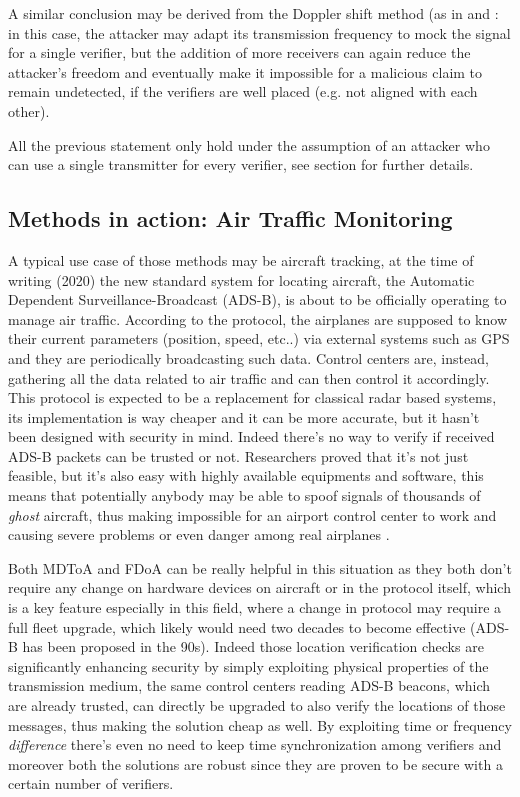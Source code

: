 \documentclass[conference]{IEEEtran}
\begin{document}
A similar conclusion may be derived from the Doppler shift method (as in \cite{schaefer16} and \cite{ghose15}: in this case, the attacker may adapt its transmission frequency to mock the signal for a single verifier, but the addition of more receivers can again reduce the attacker's freedom and eventually make it impossible for a malicious claim to remain undetected, if the verifiers are well placed (e.g. not aligned with each other).

All the previous statement only hold under the assumption of an attacker who can use a single transmitter for every verifier, see section %
for further details.

\subsection{Methods in action: Air Traffic Monitoring}

A typical use case of those methods may be aircraft tracking, at the time of writing (2020) the new standard system for locating aircraft, the Automatic Dependent Surveillance-Broadcast (ADS-B), is about to be officially operating to manage air traffic. According to the protocol, the airplanes are supposed to know their current parameters (position, speed, etc..) via external systems such as GPS and they are periodically broadcasting such data. Control centers are, instead, gathering all the data related to air traffic and can then control it accordingly. This protocol is expected to be a replacement for classical radar based systems, its implementation is way cheaper and it can be more accurate, but it hasn't been designed with security in mind. Indeed there's no way to verify if received ADS-B packets can be trusted or not.
Researchers proved that it's not just feasible, but it's also easy with highly available equipments and software, this means that potentially anybody may be able to spoof signals of thousands of \textit{ghost} aircraft, thus making impossible for an airport control center to work and causing severe problems or even danger among real airplanes \cite{costin12}.

Both MDToA and FDoA can be really helpful in this situation as they both don't require any change on hardware devices on aircraft or in the protocol itself, which is a key feature especially in this field, where a change in protocol may require a full fleet upgrade, which likely would need two decades to become effective (ADS-B has been proposed in the 90s). Indeed those location verification checks are significantly enhancing security by simply exploiting physical properties of the transmission medium, the same control centers reading ADS-B beacons, which are already trusted, can directly be upgraded to also verify the locations of those messages, thus making the solution cheap as well. By exploiting time or frequency \textit{difference} there's even no need to keep time synchronization among verifiers and moreover both the solutions are robust since they are proven to be secure with a certain number of verifiers.
\end{document}

